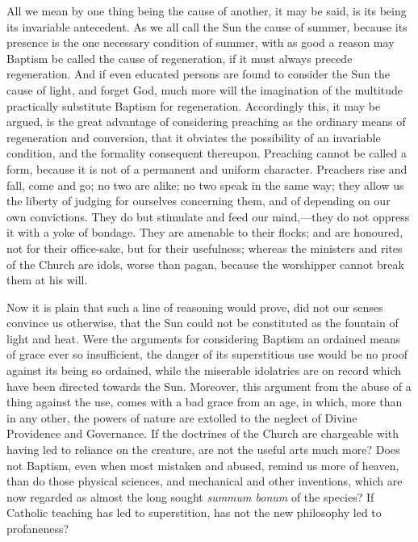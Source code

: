All we mean by one thing being the cause of another, it may be
said, is its being its invariable antecedent. As we all call the Sun
the cause of summer, because its presence is the one necessary
condition of summer, with as good a reason may Baptism be called the
cause of regeneration, if it must always precede regeneration. And if
even educated persons are found to consider the Sun the cause of
light, and forget God, much more will the imagination of the multitude
practically substitute Baptism for regeneration. Accordingly this, it
may be argued, is the great advantage of considering preaching as the
ordinary means of regeneration and conversion, that it obviates the
possibility of an invariable condition, and the formality consequent
thereupon. Preaching cannot be called a form, because it is not of a
permanent and uniform character. Preachers rise and fall, come and go;
no two are alike; no two speak in the same way; they allow us the
liberty of judging for ourselves concerning them, and of depending on
our own convictions. They do but stimulate and feed our mind,—they
do not oppress it with a yoke of bondage. They are amenable to their
flocks; and are honoured, not for their office-sake, but for their
usefulness; whereas the ministers and rites of the Church are idols,
worse than pagan, because the worshipper cannot break them at his
will.

Now it is plain that such a line of reasoning would prove, did not
our senses convince us otherwise, that the Sun could not be
constituted as the fountain of light and heat. Were the arguments for
considering Baptism an ordained means of grace ever so insufficient,
the danger of its superstitious use would be no proof against
its being so ordained, while the miserable idolatries are on record
which have been directed towards the Sun. Moreover, this argument from
the abuse of a thing against the use, comes with a bad grace from an
age, in which, more than in any other, the powers of nature are
extolled to the neglect of Divine Providence and Governance. If the
doctrines of the Church are chargeable with having led to reliance on
the creature, are not the useful arts much more? Does not Baptism,
even when most mistaken and abused, remind us more of heaven, than do
those physical sciences, and mechanical and other inventions, which
are now regarded as almost the long sought \emph{summum bonum} of the
species? If Catholic teaching has led to superstition, has not the new
philosophy led to profaneness?


